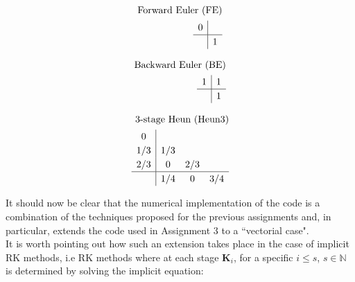 \documentclass[11pt]{article}
\theoremstyle{theorem}
\theoremstyle{definition}
\begin{document}
\begin{center}
	\begin{minipage}{0.3\linewidth}
		\begin{align*}
		\renewcommand\arraystretch{1.2}
		\textnormal{Forward Euler (FE)} \\
		\begin{array}
		{c|c}
		0 &
		\\
		\hline
		& 1
		\end{array}
		\end{align*}
	\end{minipage}
	\begin{minipage}{0.3\linewidth}
		\begin{align*}
		\renewcommand\arraystretch{1.2}
		\textnormal{Backward Euler (BE)} \\
		\begin{array}
		{c|c}
		1 & 1
		\\
		\hline
		& 1
		\end{array}
		\end{align*}
	\end{minipage}
	\begin{minipage}{0.3\linewidth}
		\begin{align*}
		\renewcommand\arraystretch{1.2}
		\textnormal{3-stage Heun (Heun3)} \\
		\begin{array}
		{c|ccc}
		0 & & \\
		1/3 & 1/3 & \\
		2/3 & 0 & 2/3 \\
		\hline
		& 1/4 & 0 & 3/4
		\end{array}
		\end{align*}
	\end{minipage}
\end{center}

It should now be clear that the numerical implementation of the code is a combination of the techniques proposed for the previous assignments and, in particular, extends the code used in Assignment 3 to a ``vectorial case".\\
It is worth pointing out how such an extension takes place in the case of implicit RK methods, i.e RK methods where at each stage $\mathbf{K}_i $, for a specific $ i \leq s $, $s\in\mathbb{N}$ is determined by solving the implicit equation:
\end{document}
